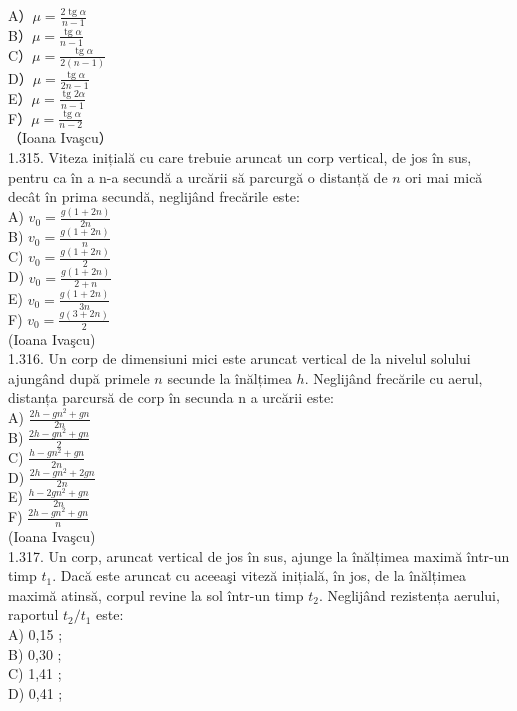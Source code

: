 \documentclass[10pt]{article}
\begin{document}
A）$\mu=\frac{2 \operatorname{tg} \alpha}{n-1}$\\
B）$\mu=\frac{\operatorname{tg} \alpha}{n-1}$\\
C）$\mu=\frac{\operatorname{tg} \alpha}{2(n-1)}$\\
D）$\mu=\frac{\operatorname{tg} \alpha}{2 n-1}$\\
E）$\mu=\frac{\operatorname{tg} 2 \alpha}{n-1}$\\
F）$\mu=\frac{\operatorname{tg} \alpha}{n-2}$\\
（Ioana Ivaşcu）\\
1.315. Viteza inițială cu care trebuie aruncat un corp vertical, de jos în sus, pentru ca în a n-a secundă a urcării să parcurgă o distanță de $n$ ori mai mică decât în prima secundă, neglijând frecările este:\\
A) $v_{0}=\frac{g(1+2 n)}{2 n}$\\
B) $v_{0}=\frac{g(1+2 n)}{n}$\\
C) $v_{0}=\frac{g(1+2 n)}{2}$\\
D) $v_{0}=\frac{g(1+2 n)}{2+n}$\\
E) $v_{0}=\frac{g(1+2 n)}{3 n}$\\
F) $v_{0}=\frac{g(3+2 n)}{2}$\\
(Ioana Ivaşcu)\\
1.316. Un corp de dimensiuni mici este aruncat vertical de la nivelul solului ajungând după primele $n$ secunde la înălțimea $h$. Neglijând frecările cu aerul, distanța parcursă de corp în secunda n a urcării este:\\
A) $\frac{2 h-g n^{2}+g n}{2 n}$\\
B) $\frac{2 h-g n^{2}+g n}{2}$\\
C) $\frac{h-g n^{2}+g n}{2 n}$\\
D) $\frac{2 h-g n^{2}+2 g n}{2 n}$\\
E) $\frac{h-2 g n^{2}+g n}{2 n}$\\
F) $\frac{2 h-g n^{2}+g n}{n}$\\
(Ioana Ivaşcu)\\
1.317. Un corp, aruncat vertical de jos în sus, ajunge la înălțimea maximă într-un timp $t_{1}$. Dacă este aruncat cu aceeaşi viteză inițială, în jos, de la înălțimea maximă atinsă, corpul revine la sol într-un timp $t_{2}$. Neglijând rezistența aerului, raportul $t_{2} / t_{1}$ este:\\
A) 0,15 ;\\
B) 0,30 ;\\
C) 1,41 ;\\
D) 0,41 ;\\
\end{document}
